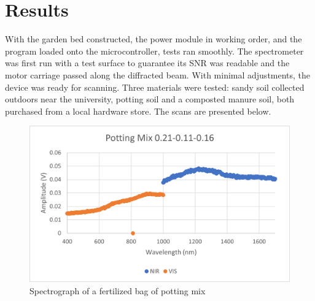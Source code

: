 \documentclass[journal]{IEEEtran}
\begin{document}
\section{Results}
With the garden bed constructed, the power module in working order, and the program loaded onto the microcontroller, 
tests ran smoothly. The spectrometer was first run with a test surface to guarantee its SNR was readable and the 
motor carriage passed along the diffracted beam. With minimal adjustments, the device was ready for scanning. 
Three materials were tested: sandy soil collected outdoors near the university, potting soil and a composted 
manure soil, both purchased from a local hardware store. The scans are presented below.
\begin{figure}[H]
   \centering
   \label{fig:Data1}
   \includegraphics[scale=0.6]{images/Data1.png}
   \caption{Spectrograph of a fertilized bag of potting mix}
\end{figure}
\end{document}
